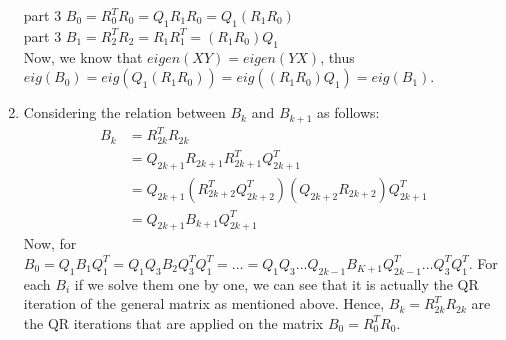 \documentclass{article}
\begin{document}
\begin{enumerate}[label=\alph*]
    part 3 $B_0 = R_0^TR_0 = Q_1R_1R_0 = Q_1(R_1R_0)$\\
    part 3 $B_1 = R_2^TR_2 = R_1R_1^T = (R_1R_0)Q_1$\\
    Now, we know that $eigen(XY)=eigen(YX)$, thus \\
    $eig(B_0) = eig(Q_1(R_1R_0)) = eig((R_1R_0)Q_1) = eig(B_1)$.
    \item Considering the relation between $B_k$ and $B_{k+1}$ as follows:
    \begin{align*}
        B_k & = R_{2k}^TR_{2k}\\
         &= Q_{2k+1}R_{2k+1}R_{2k+1}^TQ_{2k+1}^T\\
         &= Q_{2k+1}(R^T_{2k+2}Q^T_{2k+2})(Q_{2k+2}R_{2k+2})Q^T_{2k+1}\\
         &= Q_{2k+1}B_{k+1}Q^T_{2k+1}\
    \end{align*}
    Now, for $B_0 = Q_1B_1Q_1^T =Q_1Q_3B_2Q_3^TQ_1^T =\ldots=Q_1Q_3\ldots Q_{2k-1}B_{K+1}Q^T_{2k-1}\ldots Q^T_3Q_1^T$.
    For each $B_i$ if we solve them one by one, we can see that it is actually the QR iteration of the general matrix as mentioned above. Hence, $B_k = R_{2k}^TR_{2k}$ are the QR iterations that are applied on the matrix $B_0 = R_{0}^TR_{0}$.
\end{enumerate}
\end{document}
